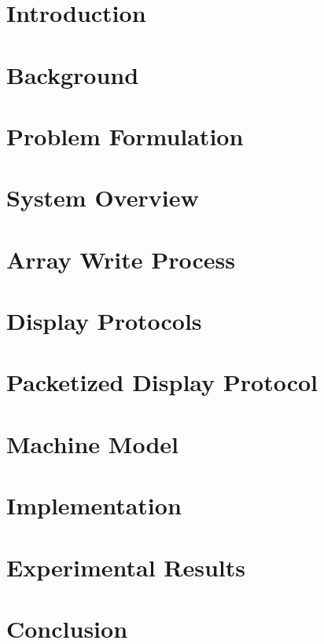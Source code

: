 \documentclass{udthesis}
\begin{document}

    \chapter{Introduction}
        
    \chapter{Background}
        
    \chapter{Problem Formulation}
        
    \chapter{System Overview}
        
    \chapter{Array Write Process} %
        
    \chapter{Display Protocols} %
        
    \chapter{Packetized Display Protocol}
        
    \chapter{Machine Model}
        
    \chapter{Implementation}
        
    \chapter{Experimental Results}
        
    \chapter{Conclusion}
        

    \renewcommand{\bibname}{References}
    \pdfstringdefDisableCommands{\let\uppercase\relax}
    
    
\end{document}
